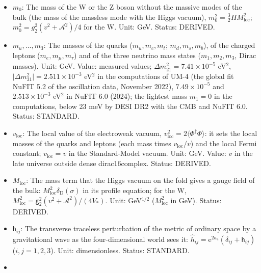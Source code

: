 \documentclass[
  10pt,
]{article}
\begin{document}
\begin{itemize}
  three neutrino mass states; in a frame component such as
  \(\mathcal{S}^{(i)}{}_{(i)}\) one of the three directions of ordinary
  space (the three components are equal), and in a tensor of ordinary
  space such as \(\mathsf{h}_{ij}\) one of the directions
  \(x_1, x_2, x_3\); a repeated index is not summed unless a sum sign is
  written. Status: STANDARD.
\item
  \(m_0\): The mass of the W or the Z boson without the massive modes of
  the bulk (the mass of the massless mode with the Higgs vacuum),
  \(m_0^2 = \frac32HM_{\mathrm{loc}}^2\);
  \(m_0^2 = g_2^2(v^2 + \mathcal{A}^2)/4\) for the W. Unit: GeV. Status:
  DERIVED.
\item
  \(m_u, \dots, m_3\): The masses of the quarks (\(m_u, m_c, m_t\);
  \(m_d, m_s, m_b\)), of the charged leptons (\(m_e, m_\mu, m_\tau\))
  and of the three neutrino mass states (\(m_1, m_2, m_3\), Dirac
  masses). Unit: GeV. Value: measured values;
  \(\Delta m_{21}^2 = 7.41\times10^{-5}\) eV\(^2\),
  \(\lvert\Delta m_{31}^2\rvert = 2.511\times10^{-3}\) eV\(^2\) in the
  computations of UM-4 (the global fit NuFIT 5.2 of the oscillation
  data, November 2022), \(7.49\times10^{-5}\) and \(2.513\times10^{-3}\)
  eV\(^2\) in NuFIT 6.0 (2024); the lightest mass \(m_1 = 0\) in the
  computations, below 23 meV by DESI DR2 with the CMB and NuFIT 6.0.
  Status: STANDARD.
\item
  \(v_{\mathrm{loc}}\): The local value of the electroweak vacuum,
  \(v_{\mathrm{loc}}^2 = 2\langle\Phi^\dagger\Phi\rangle\): it sets the
  local masses of the quarks and leptons (each mass times
  \(v_{\mathrm{loc}}/v\)) and the local Fermi constant;
  \(v_{\mathrm{loc}} = v\) in the Standard-Model vacuum. Unit: GeV.
  Value: \(v\) in the late universe outside dense dirac16complex.
  Status: DERIVED.
\item
  \(M_{\mathrm{loc}}\): The mass term that the Higgs vacuum on the fold
  gives a gauge field of the bulk:
  \(M_{\mathrm{loc}}^2\delta_{\mathrm{D}}(\sigma)\) in its profile
  equation; for the W,
  \(M_{\mathrm{loc}}^2 = \mathsf{g}_2^2(v^2 + \mathcal{A}^2)/(4V_*)\).
  Unit: GeV\(^{1/2}\) (\(M_{\mathrm{loc}}^2\) in GeV). Status: DERIVED.
\item
  \(\mathsf{h}_{ij}\): The transverse traceless perturbation of the
  metric of ordinary space by a gravitational wave as the
  four-dimensional world sees it:
  \(\hat h_{ij} = \mathrm{e}^{2a_4}(\delta_{ij} + \mathsf{h}_{ij})\)
  (\(i, j = 1, 2, 3\)). Unit: dimensionless. Status: STANDARD.
\item

\end{itemize}
\end{document}
